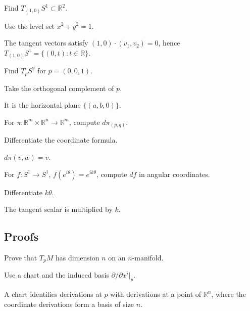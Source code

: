 \begin{exercise}\label{exr:vii04-ped-02}
Find \(T_{(1,0)}S^1\subset\mathbb R^2\).
\end{exercise}
\begin{hint}
Use the level set \(x^2+y^2=1\).
\end{hint}
\begin{solution}
The tangent vectors satisfy \((1,0)\cdot(v_1,v_2)=0\), hence \(T_{(1,0)}S^1=\{(0,t):t\in\mathbb R\}\).
\end{solution}

\begin{exercise}\label{exr:vii04-ped-03}
Find \(T_pS^2\) for \(p=(0,0,1)\).
\end{exercise}
\begin{hint}
Take the orthogonal complement of \(p\).
\end{hint}
\begin{solution}
It is the horizontal plane \(\{(a,b,0)\}\).
\end{solution}

\begin{exercise}\label{exr:vii04-ped-04}
For \(\pi:\mathbb R^m\times\mathbb R^n\to\mathbb R^m\), compute \(d\pi_{(p,q)}\).
\end{exercise}
\begin{hint}
Differentiate the coordinate formula.
\end{hint}
\begin{solution}
\(d\pi(v,w)=v\).
\end{solution}

\begin{exercise}\label{exr:vii04-ped-05}
For \(f:S^1\to S^1\), \(f(e^{i\theta})=e^{ik\theta}\), compute \(df\) in angular coordinates.
\end{exercise}
\begin{hint}
Differentiate \(k\theta\).
\end{hint}
\begin{solution}
The tangent scalar is multiplied by \(k\).
\end{solution}

\subsection*{Proofs}

\begin{exercise}\label{exr:vii04-ped-06}
Prove that \(T_pM\) has dimension \(n\) on an \(n\)-manifold.
\end{exercise}
\begin{hint}
Use a chart and the induced basis \(\partial/\partial x^i|_p\).
\end{hint}
\begin{solution}
A chart identifies derivations at \(p\) with derivations at a point of \(\mathbb R^n\), where the coordinate derivations form a basis of size \(n\).
\end{solution}

